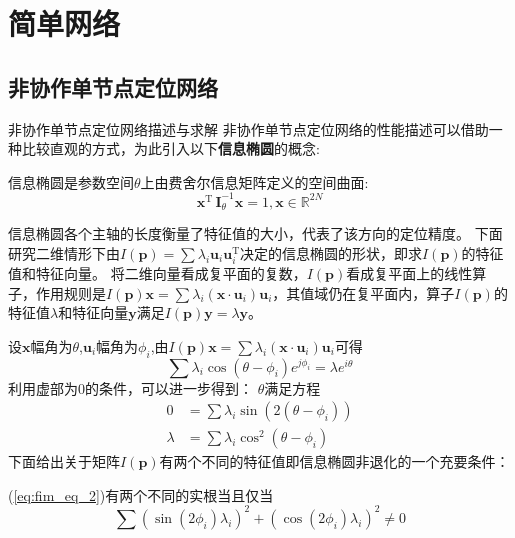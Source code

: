 \chapter{简单网络}\label{cha:content3}

\section{非协作单节点定位网络}\label{section:circle_general}
{非协作单节点定位网络描述与求解}
非协作单节点定位网络的性能描述可以借助一种比较直观的方式，为此引入以下\textbf{信息椭圆}的概念\cite{LimitBound}:
\begin{definition}
信息椭圆是参数空间$\theta$上由费舍尔信息矩阵定义的空间曲面:
\begin{equation}\label{eq:ie}
\bm{x}^{\textrm{T}} \,\bm{I}_{\theta}^{-1}\bm{x}=1,\bm{x}\in \mathbb{R}^{2N}
\end{equation}
\end{definition}
信息椭圆各个主轴的长度衡量了特征值的大小，代表了该方向的定位精度。
下面研究二维情形下由$I(\bm{p})=\sum \lambda_i \bm{u}_i \bm{u}_i^{\textrm{T}} $决定的信息椭圆的形状，即求$I(\bm{p})$的特征值和特征向量。
将二维向量看成复平面的复数，$I(\bm{p})$看成复平面上的线性算子，作用规则是$I(\bm{p})\bm{x}=\sum \lambda_i (\bm{x}\cdot\bm{u}_i)\bm{u}_i$，其值域仍在复平面内，算子$I(\bm{p})$的特征值$\lambda$和特征向量$\bm{y}$满足$I(\bm{p})\bm{y}=\lambda \bm{y}$。


设$\bm{x}$幅角为$\theta$,$\bm{u}_i$幅角为$\phi_i$,由$I(\bm{p})\bm{x}=\sum \lambda_i (\bm{x}\cdot\bm{u}_i)\bm{u}_i$可得
\begin{equation}
\sum \lambda_i \cos(\theta-\phi_i)e^{j\phi_i}=\lambda e^{i\theta}
\end{equation}
利用虚部为0的条件，可以进一步得到：
$\theta$满足方程
\begin{align}\label{eq:fim_eq_1}
0&=\sum \lambda_i \sin(2(\theta-\phi_i))\\
\lambda&=\sum \lambda_i \cos^2(\theta-\phi_i)\label{eq:fim_eq_2}
\end{align}
下面给出关于矩阵$I(\bm{p})$有两个不同的特征值即信息椭圆非退化的一个充要条件：
\begin{theorem}
(\ref{eq:fim_eq_2})有两个不同的实根当且仅当\[
\sum (\sin(2\phi_i)\lambda_i)^2+(\cos(2\phi_i)\lambda_i)^2 \neq 0\]
\end{theorem}


